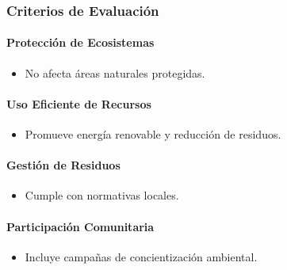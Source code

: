 \documentclass[letterpaper, 11pt]{report}
\begin{document}
\subsubsection{Criterios de Evaluación}

\paragraph{Protección de Ecosistemas}
\begin{itemize}
      \item No afecta áreas naturales protegidas.
\end{itemize}

\paragraph{Uso Eficiente de Recursos}
\begin{itemize}
      \item Promueve energía renovable y reducción de residuos.
\end{itemize}

\paragraph{Gestión de Residuos}
\begin{itemize}
      \item Cumple con normativas locales.
\end{itemize}

\paragraph{Participación Comunitaria}
\begin{itemize}
      \item Incluye campañas de concientización ambiental.
\end{itemize}
\end{document}
